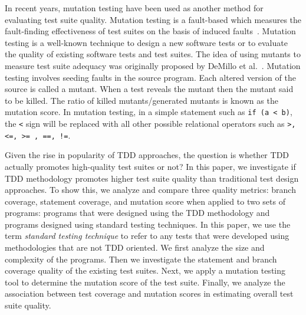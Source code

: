 \documentclass[conference]{IEEEtran}
\begin{document}
In recent years, mutation testing have been used as another method for evaluating test suite quality. Mutation testing is a fault-based which measures the fault-finding effectiveness of test suites on the basis of induced faults~\cite{demillo1978hints, hamlet1977testing}. Mutation testing is a well-known technique to design a new software tests or to evaluate the quality of existing software tests and test suites. The idea of using mutants to measure test suite adequacy was originally proposed by DeMillo et al.~\cite{demillo1978hints}. Mutation testing involves seeding faults in the source program. Each altered version of the source is called a mutant. When a test reveals the mutant then the mutant said to be killed. %
The ratio of killed mutants/generated mutants is known as the mutation score. In mutation testing, in a simple statement such as  \texttt{if (a < b)}, the \texttt{<} sign will be replaced with all other possible relational operators such as \texttt{>, <=, >= , ==, !=}. 

Given the rise in popularity of TDD approaches, the question is whether TDD actually promotes high-quality test suites or not? In this paper, we  investigate if TDD methodology promotes higher test suite quality than traditional test design approaches. To show this, we analyze and compare three quality metrics: branch coverage, statement coverage, and mutation score when applied to two sets of programs: programs that were designed using the TDD methodology and programs designed using standard testing techniques. In this paper, we use the term \textit{standard testing technique} to refer to any tests that were developed using methodologies that are not TDD oriented. We first analyze the size and complexity of the programs.  Then we investigate the statement and branch coverage quality of the existing test suites. Next, we apply a mutation testing tool to determine the mutation score of the test suite.  Finally, we analyze the association between test coverage and mutation scores in estimating overall test suite quality.

\end{document}
